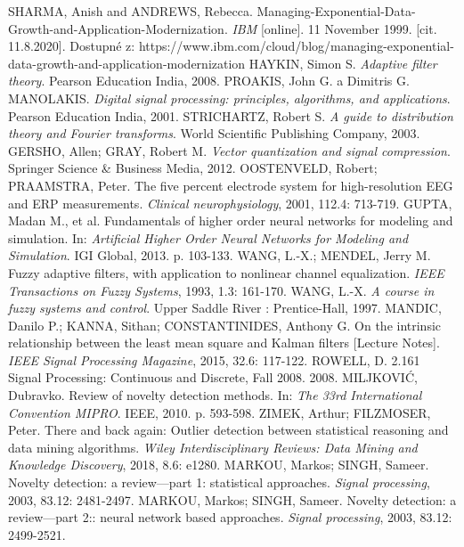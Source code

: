 \documentclass[11pt,twoside,openright]{report}
\begin{document}
\renewcommand{\bibname}{Literatura}
\begin{thebibliography}{L}
SHARMA, Anish and ANDREWS, Rebecca. Managing-Exponential-Data-Growth-and-Application-Modernization. \textit{IBM} [online]. 11 November 1999. [cit. 11.8.2020]. Dostupné z: https://www.ibm.com/cloud/blog/managing-exponential-data-growth-and-application-modernization 
HAYKIN, Simon S. \textit{Adaptive filter theory}. Pearson Education India, 2008.
PROAKIS, John G. a Dimitris G. MANOLAKIS. \textit{Digital signal processing: principles, algorithms, and applications}. Pearson Education India, 2001.
STRICHARTZ, Robert S. \textit{A guide to distribution theory and Fourier transforms}. World Scientific Publishing Company, 2003.
GERSHO, Allen; GRAY, Robert M. \textit{Vector quantization and signal compression}. Springer Science \& Business Media, 2012.
OOSTENVELD, Robert; PRAAMSTRA, Peter. The five percent electrode system for high-resolution EEG and ERP measurements. \textit{Clinical neurophysiology}, 2001, 112.4: 713-719.
GUPTA, Madan M., et al. Fundamentals of higher order neural networks for modeling and simulation. In: \textit{Artificial Higher Order Neural Networks for Modeling and Simulation}. IGI Global, 2013. p. 103-133.
WANG, L.-X.; MENDEL, Jerry M. Fuzzy adaptive filters, with application to nonlinear channel equalization. \textit{IEEE Transactions on Fuzzy Systems}, 1993, 1.3: 161-170.
WANG, L.-X. \textit{A course in fuzzy systems and control}. Upper Saddle River : Prentice-Hall, 1997.
MANDIC, Danilo P.; KANNA, Sithan; CONSTANTINIDES, Anthony G. On the intrinsic relationship between the least mean square and Kalman filters [Lecture Notes]. \textit{IEEE Signal Processing Magazine}, 2015, 32.6: 117-122.
ROWELL, D. 2.161 Signal Processing: Continuous and Discrete, Fall 2008. 2008.
MILJKOVIĆ, Dubravko. Review of novelty detection methods. In: \textit{The 33rd International Convention MIPRO}. IEEE, 2010. p. 593-598.
ZIMEK, Arthur; FILZMOSER, Peter. There and back again: Outlier detection between statistical reasoning and data mining algorithms. \textit{Wiley Interdisciplinary Reviews: Data Mining and Knowledge Discovery}, 2018, 8.6: e1280.
MARKOU, Markos; SINGH, Sameer. Novelty detection: a review—part 1: statistical approaches. \textit{Signal processing}, 2003, 83.12: 2481-2497.
MARKOU, Markos; SINGH, Sameer. Novelty detection: a review—part 2:: neural network based approaches. \textit{Signal processing}, 2003, 83.12: 2499-2521.

\end{thebibliography}
\end{document}
